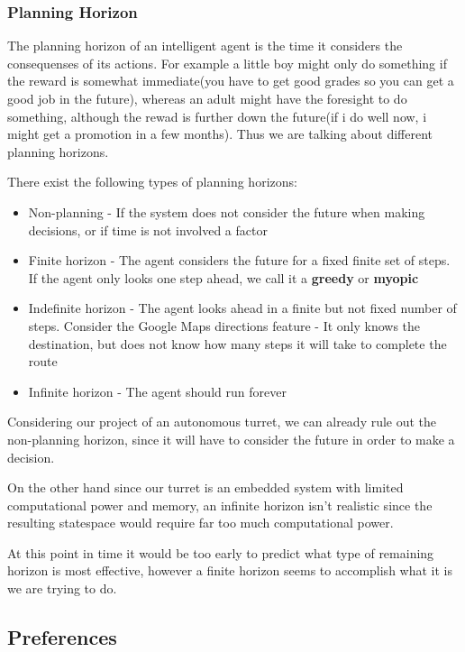 \subsubsection{Planning Horizon}
The planning horizon of an intelligent agent is the time it considers the
consequenses of its actions. For example a little boy might only do something if
the reward is somewhat immediate(you have to get good grades so you can get a
good job in the future), whereas an adult might have the foresight to do
something, although the rewad is further down the future(if i do well now, i
might get a promotion in a few months). Thus we are talking about different
planning horizons.

There exist the following types of planning horizons:
\begin{itemize}
	\item Non-planning - If the system does not consider the future when making
	decisions, or if time is not involved a factor
	\item Finite horizon - The agent considers the future for a fixed finite set
	of steps. If the agent only looks one step ahead, we call it a \textbf{greedy}
	or \textbf{myopic}
	\item Indefinite horizon - The agent looks ahead in a finite but not fixed
	number of steps. Consider the Google Maps directions feature - It only knows
	the destination, but does not know how many steps it will take to complete
	the route
	\item Infinite horizon - The agent should run forever
\end{itemize}

Considering our project of an autonomous turret, we can already rule out the
non-planning horizon, since it will have to consider the future in order to
make a decision.

On the other hand since our turret is an embedded system with limited
computational power and memory, an infinite horizon isn’t realistic since the
resulting statespace would require far too much computational power.

At this point in time it would be too early to predict what type of
remaining horizon is most effective, however a finite horizon seems to
accomplish what it is we are trying to do.

\subsection{Preferences}


